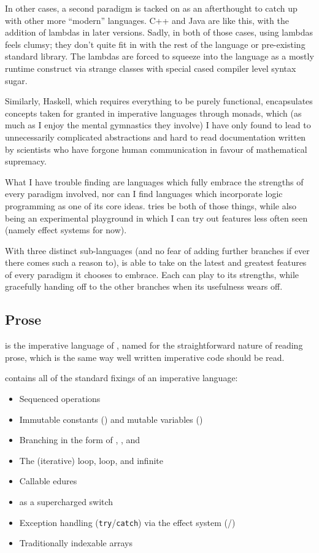 In other cases, a second paradigm is tacked on as an afterthought to catch up with
other more ``modern'' languages. C++ and Java are like this, with the addition of
lambdas in later versions. Sadly, in both of those cases, using lambdas
feels clumsy; they don't quite fit in with the rest of the language or
pre-existing standard library. The lambdas are forced to squeeze into the
language as a mostly runtime construct via strange classes with special cased
compiler level syntax sugar.

Similarly, Haskell, which requires everything to be purely functional, encapsulates
concepts taken for granted in imperative languages through monads, which (as much
as I enjoy the mental gymnastics they involve) I have only found to lead to
unnecessarily complicated abstractions and hard to read documentation written
by scientists who have forgone human communication in favour of mathematical supremacy.

What I have trouble finding are languages which fully embrace the strengths of
every paradigm involved, nor can I find languages which incorporate logic programming
as one of its core ideas. \Trilogy{} tries be both of those things, while also
being an experimental playground in which I can try out features less often seen
(namely effect systems for now).

With three distinct sub-languages (and no fear of adding further branches if ever
there comes such a reason to), \Trilogy{} is able to take on the latest and greatest
features of every paradigm it chooses to embrace. Each can play to its strengths,
while gracefully handing off to the other branches when its usefulness wears off.

\subsection{Prose}

\Prose{} is the imperative language of \Trilogy{}, named for the
straightforward nature of reading prose, which is the same way
well written imperative code should be read.

\Prose{} contains all of the standard fixings of an imperative language:
\begin{itemize}
    \item Sequenced operations
    \item Immutable constants () and mutable variables ()
    \item Branching in the form of , , and 
    \item The (iterative)  loop,  loop, and infinite 
    \item Callable edures
    \item {} as a supercharged switch
    \item Exception handling (\texttt{try}/\texttt{catch}) via the effect system (/)
    \item Traditionally indexable arrays
\end{itemize}

